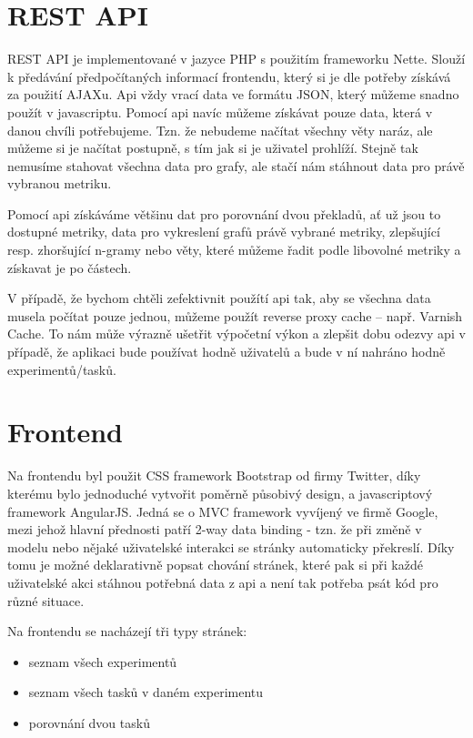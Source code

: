 \section{REST API}
REST API je implementované v jazyce PHP s použitím frameworku Nette.
Slouží k předávání předpočítaných informací frontendu,
  který si je dle potřeby získává za použití AJAXu.
Api vždy vrací data ve formátu JSON,
  který můžeme snadno použít v javascriptu.
Pomocí api navíc můžeme získávat pouze data,
  která v danou chvíli potřebujeme.
Tzn. že nebudeme načítat všechny věty naráz,
  ale můžeme si je načítat postupně,
  s tím jak si je uživatel prohlíží.
Stejně tak nemusíme stahovat všechna data pro grafy,
  ale stačí nám stáhnout data pro právě vybranou metriku.

Pomocí api získáváme většinu dat pro porovnání dvou překladů,
  ať už jsou to dostupné metriky,
  data pro vykreslení grafů právě vybrané metriky,
  zlepšující resp. zhoršující \mbox{n-gramy}
  nebo věty,
  které můžeme řadit podle libovolné metriky a získavat je po částech.

V případě, že bychom chtěli zefektivnit použítí api tak,
  aby se všechna data musela počítat pouze jednou,
  můžeme použít reverse proxy cache -- např. Varnish Cache.
To nám může výrazně ušetřit výpočetní výkon a zlepšit dobu odezvy api v případě,
  že aplikaci bude používat hodně uživatelů
  a bude v ní nahráno hodně experimentů/tasků.

\section{Frontend}
Na frontendu byl použit CSS framework Bootstrap od firmy Twitter,
  díky kterému bylo jednoduché vytvořit poměrně působivý design,
  a javascriptový framework AngularJS.
Jedná se o MVC framework vyvíjený ve firmě Google,
  mezi jehož hlavní přednosti patří 2-way data binding -
  tzn. že při změně v modelu nebo nějaké uživatelské interakci se stránky automaticky překreslí.
Díky tomu je možné deklarativně popsat chování stránek,
  které pak si při každé uživatelské akci stáhnou potřebná data z api
  a není tak potřeba psát kód pro různé situace.

Na frontendu se nacházejí tři typy stránek:
\begin{itemize}
  \item seznam všech experimentů
  \item seznam všech tasků v daném experimentu
  \item porovnání dvou tasků
\end{itemize}


